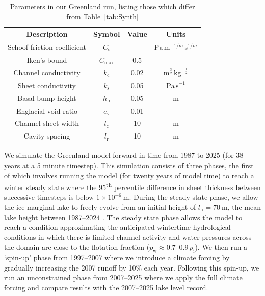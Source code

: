 \documentclass[tc, manuscript]{copernicus}
\begin{document}
\begin{table}[t]
\caption{Parameters in our Greenland run, listing those which differ from Table~\ref{tab:Synth}}
\label{tab:Greenland}
\begin{tabular}{@{}cccc}
\hline
Description & Symbol & Value & Units \\
\hline
Schoof friction coefficient & $C_{\mathrm{s}}$ & & $\mathrm{Pa} \, \mathrm{m}^{-1/m}\,\mathrm{s}^{1/m}$ \\
Iken's bound & $C_{\mathrm{max}}$ & 0.5 & \\
Channel conductivity & $k_{\mathrm{c}}$ & 0.02 & $\mathrm{m}^{\frac{3}{2}}\, \mathrm{kg}^{-\frac{1}{2}}$ \\
Sheet conductivity & $k_{\mathrm{s}}$& 0.05 & $\mathrm{Pa\, s}^{-1}$ \\ 
Basal bump height & $h_{\mathrm{b}}$& 0.05 & m \\
Englacial void ratio & $e_{\mathrm{v}}$ & 0.01 & \\
Channel sheet width & $l_{\mathrm{c}}$& 10 & $\mathrm{m}$ \\
Cavity spacing & $l_{\mathrm{r}}$& 10 & $\mathrm{m}$ \\
\hline
\end{tabular}

\end{table}

We simulate the Greenland model forward in time from 1987 to 2025 (for 38 years at a 5 minute timestep). This simulation consists of three phases, the first of which involves running the model (for twenty years of model time) to reach a winter steady state where the 95\textsuperscript{th} percentile difference in sheet thickness between successive timesteps is below $1\times10^{-6}\ \mathrm{m}$. During the steady state phase, we allow the ice-marginal lake to freely evolve from an initial height of $l_{\mathrm{h}}=70\ \mathrm{m}$, the mean lake height between 1987--2024 \citep{livingstone2025ice}. The steady state phase allows the model to reach a condition approximating the anticipated wintertime hydrological conditions in which there is limited channel activity and water pressures across the domain are close to the flotation fraction ($p_{\mathrm{w}}\approx 0.7\text{--}0.9 \, p_{\mathrm{i}}$). We then run a `spin-up' phase from 1997--2007 where we introduce a climate forcing by gradually increasing the 2007 runoff by 10\% each year. Following this spin-up, we run an unconstrained phase from 2007--2025 where we apply the full climate forcing and compare results with the 2007--2025 lake level record.
\end{document}
